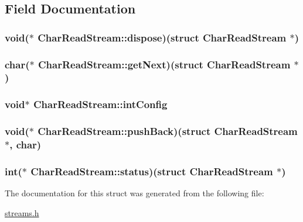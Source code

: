 \subsection{Field Documentation}
\hypertarget{structCharReadStream_a93a3bc86d1bd1fd5474cc7560c99064b}{
\subsubsection[{dispose}]{\setlength{\rightskip}{0pt plus 5cm}void($\ast$ Char\+Read\+Stream\+::dispose)(struct {\bf Char\+Read\+Stream} $\ast$)}}\label{structCharReadStream_a93a3bc86d1bd1fd5474cc7560c99064b}
\hypertarget{structCharReadStream_a09b21830d1105a95d9a92b0a49fedad5}{
\subsubsection[{get\+Next}]{\setlength{\rightskip}{0pt plus 5cm}char($\ast$ Char\+Read\+Stream\+::get\+Next)(struct {\bf Char\+Read\+Stream} $\ast$)}}\label{structCharReadStream_a09b21830d1105a95d9a92b0a49fedad5}
\hypertarget{structCharReadStream_a77994823bffd8c98b260a0e8a2686903}{
\subsubsection[{int\+Config}]{\setlength{\rightskip}{0pt plus 5cm}void$\ast$ Char\+Read\+Stream\+::int\+Config}}\label{structCharReadStream_a77994823bffd8c98b260a0e8a2686903}
\hypertarget{structCharReadStream_ad228a25b65700caa315dc98f8a1cb067}{
\subsubsection[{push\+Back}]{\setlength{\rightskip}{0pt plus 5cm}void($\ast$ Char\+Read\+Stream\+::push\+Back)(struct {\bf Char\+Read\+Stream} $\ast$, char)}}\label{structCharReadStream_ad228a25b65700caa315dc98f8a1cb067}
\hypertarget{structCharReadStream_a6932167a4c9ee2fd7b56219bebdfdb9f}{
\subsubsection[{status}]{\setlength{\rightskip}{0pt plus 5cm}int($\ast$ Char\+Read\+Stream\+::status)(struct {\bf Char\+Read\+Stream} $\ast$)}}\label{structCharReadStream_a6932167a4c9ee2fd7b56219bebdfdb9f}


The documentation for this struct was generated from the following file\+:\begin{DoxyCompactItemize}
\item 
\hyperlink{streams_8h}{streams.\+h}\end{DoxyCompactItemize}
